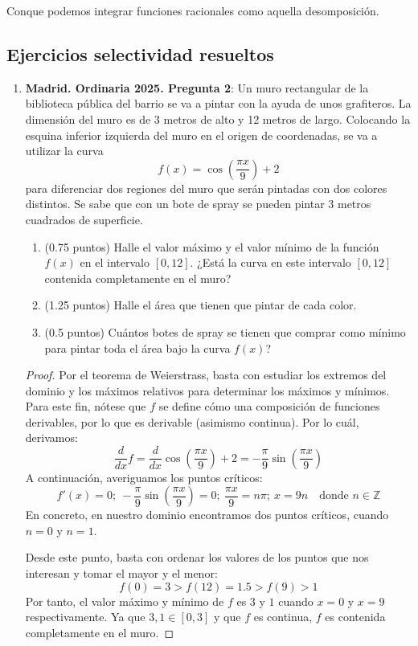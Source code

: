 \documentclass[10pt]{article}
\newcommand{\Z}{\mathbb{Z}}
\begin{document}
Conque podemos integrar funciones racionales como aquella desomposición.

\subsection{Ejercicios selectividad resueltos}

\begin{enumerate}
  \item \textbf{Madrid. Ordinaria 2025. Pregunta 2}: Un muro rectangular de la biblioteca pública del barrio se va a pintar con la ayuda de unos grafiteros. La dimensión del muro es de 3 metros de
        alto y 12 metros de largo. Colocando la esquina inferior izquierda del muro en el origen de coordenadas, se va a utilizar la curva
        \[ f(x) = \cos(\frac{\pi x}{9}) + 2 \]
        para diferenciar dos regiones del muro que serán pintadas con dos colores distintos. Se sabe que con un bote de spray se pueden pintar 3 metros cuadrados de superficie.
        \begin{enumerate}
          \item (0.75 puntos) Halle el valor máximo y el valor mínimo de la función $ f(x) $ en el intervalo $[0, 12]$. ¿Está la curva en este intervalo $ [0, 12] $ contenida completamente en el muro?
          \item (1.25 puntos) Halle el área que tienen que pintar de cada color.
          \item (0.5 puntos) Cuántos botes de spray se tienen que comprar como mínimo para pintar toda el área bajo la curva $ f(x) $?
        \end{enumerate}

        \begin{proof} %
          Por el teorema de Weierstrass, basta con estudiar los extremos del dominio y los máximos relativos para determinar los máximos y mínimos. Para este fin, nótese que $ f $ se define
          cómo una composición de funciones derivables, por lo que es derivable (asimismo continua). Por lo cuál, derivamos:
          \[ \frac{d}{dx} f = \frac{d}{dx} \cos(\frac{\pi x}{9}) + 2 = -\frac{\pi}{9} \sin(\frac{\pi x}{9}) \]
          A continuación, averiguamos los puntos críticos:
          \[ f'(x) = 0; \ -\frac{\pi}{9} \sin(\frac{\pi x}{9}) = 0; \ \frac{\pi x}{9} = n\pi; \ x = 9n \quad \text{donde } n \in \Z \]
          En concreto, en nuestro dominio encontramos dos puntos críticos, cuando $ n = 0 $ y $ n = 1 $.

          Desde este punto, basta con ordenar los valores de los puntos que nos interesan y tomar el mayor y el menor:
          \[ f(0) = 3 > f(12) = 1.5 > f(9) > 1 \]
          Por tanto, el valor máximo y mínimo de $ f $ es $ 3 $ y $ 1 $ cuando $ x = 0 $ y $ x = 9 $ respectivamente. Ya que $ 3, 1 \in [0, 3] $ y que $ f $ es continua,
          $ f $ es contenida completamente en el muro.
        \end{proof}


\end{enumerate}
\end{document}
